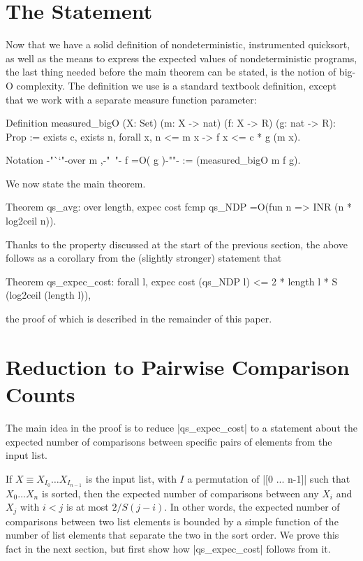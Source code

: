 \documentclass[runningheads]{llncs}
\begin{document}
\section{The Statement}
\label{statement}

Now that we have a solid definition of nondeterministic, instrumented quicksort, as well as the means to express the expected values of nondeterministic programs, the last thing needed before the main theorem can be stated, is the notion of big-O complexity. The definition we use is a standard textbook definition, except that we work with a separate measure function parameter:

\parbox{\textwidth}{\begin{code}
  Definition measured_bigO (X: Set)
    (m: X -> nat) (f: X -> R) (g: nat -> R): Prop
      := exists c, exists n, forall x, n <= m x -> f x <= c * g (m x).

  Notation {-"``"-}over m ,{-"\ "-} f =O( g ){-""-} := (measured_bigO m f g).
\end{code}}
We now state the main theorem.
\begin{code}
  Theorem qs_avg: over length,
    expec cost fcmp qs_NDP =O(fun n => INR (n * log2ceil n)).
\end{code}
Thanks to the property discussed at the start of the previous section, the above follows as a corollary from the (slightly stronger) statement that
\begin{code}
  Theorem qs_expec_cost:
    forall l, expec cost (qs_NDP l) <= 2 * length l * S (log2ceil (length l)),
\end{code}
the proof of which is described in the remainder of this paper.

\section{Reduction to Pairwise Comparison Counts}
\label{reduction}

The main idea in the proof is to reduce |qs_expec_cost| to a statement about the expected number of comparisons between specific pairs of elements from the input list.

If $X \equiv X_{I_0} \ldots X_{I_{n-1}}$ is the input list, with $I$ a permutation of |[0 ... n-1]| such that $X_0 \ldots X_n$ is sorted, then the expected number of comparisons between any $X_i$ and $X_j$ with $i < j$ is at most $2 / S (j - i)$. In other words, the expected number of comparisons between two list elements is bounded by a simple function of the number of list elements that separate the two in the sort order. We prove this fact in the next section, but first show how |qs_expec_cost| follows from it.
\end{document}
